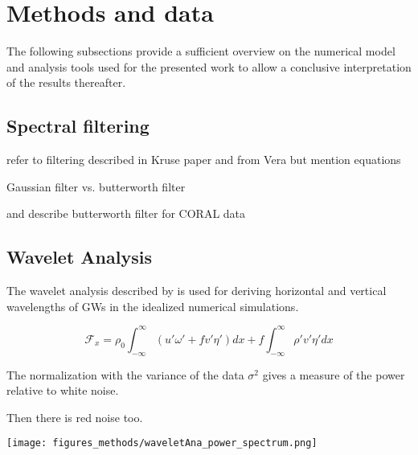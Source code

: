 \chapter{Methods and data}

The following subsections provide a sufficient overview on the numerical model and analysis tools used for the presented work to allow a conclusive interpretation of the results thereafter.

\section{Spectral filtering}

refer to filtering described in Kruse paper and from Vera
but mention equations

Gaussian filter vs. butterworth filter

and describe butterworth filter for CORAL data

\section{Wavelet Analysis}

The wavelet analysis described by \textcite{torrence_practical_1998} is used for deriving horizontal and vertical wavelengths of GWs in the idealized numerical simulations. 





\begin{equation}
    \mathcal{F}_x =  \rho_0 \int_{-\infty}^{\infty} (u'\omega' + f v' \eta') dx + f \int_{-\infty}^{\infty} \rho' v' \eta' dx
    \label{equ:morlet}
\end{equation}

The normalization with the variance of the data $\sigma^2$ gives a measure of the power relative to white noise. 

Then there is red noise too.


\begin{figure*}[tbp]
    \centering
    \texttt{[image: figures\_methods/waveletAna\_power\_spectrum.png]}
    \caption{}
    \label{fig:wavelet_example}
\end{figure*}



